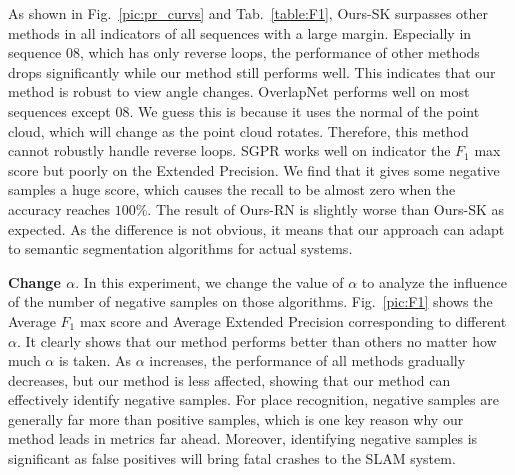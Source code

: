 \documentclass[letterpaper, 10 pt, conference]{ieeeconf}  %
\begin{document}
As shown in Fig.~\ref{pic:pr_curvs} and Tab.~\ref{table:F1}, Ours-SK surpasses other methods in all indicators of all sequences with a large margin. Especially in sequence 08, which has only reverse loops, the performance of other methods drops significantly while our method still performs well. This indicates that our method is robust to view angle changes. OverlapNet performs well on most sequences except 08. We guess this is because it uses the normal of the point cloud, which will change as the point cloud rotates. Therefore, this method cannot robustly handle reverse loops. SGPR works well on indicator the \(F_1\) max score but poorly on the Extended Precision. We find that it gives some negative samples a huge score, which causes the recall to be almost zero when the accuracy reaches \(100\%\). The result of Ours-RN is slightly worse than Ours-SK as expected. As the difference is not obvious, it means that our approach can adapt to semantic segmentation algorithms for actual systems.

\textbf{Change \(\alpha\)}. In this experiment, we change the value of \(\alpha\) to analyze the influence of the number of negative samples on those algorithms. Fig.~\ref{pic:F1} shows the Average \(F_1\) max score and Average Extended Precision corresponding to different \(\alpha\). It clearly shows that our method performs better than others no matter how much \(\alpha\) is taken. As \(\alpha\) increases, the performance of all methods gradually decreases, but our method is less affected, showing that our method can effectively identify negative samples. For place recognition, negative samples are generally far more than positive samples, which is one key reason why our method leads in metrics far ahead. Moreover, identifying negative samples is significant as false positives will bring fatal crashes to the SLAM system.
\end{document}
